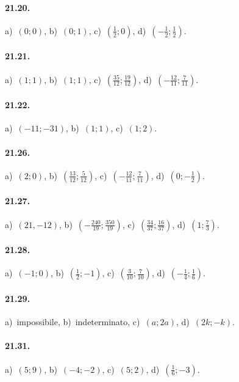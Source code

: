 \paragraph{21.20.} a)~$(0;0)$, \quad b)~$(0;1)$, \quad c)~$\left(\frac{1}{2};0\right)$, \quad d)~$\left(-{\frac{1}{2}};\frac{1}{2}\right)$.

\paragraph{21.21.} a)~$(1;1)$, \quad b)~$(1;1)$, \quad c)~$\left(\frac{35}{12};\frac{19}{12}\right)$, \quad d)~$\left(-{\frac{12}{11}};\frac{7}{11}\right)$.

\paragraph{21.22.} a)~$(-11;-31)$, \quad b)~$(1;1)$, \quad c)~$(1;2)$.

\paragraph{21.26.} a)~$(2;0)$, \quad b)~$\left(\frac{13}{12};\frac{5}{12}\right)$, \quad c)~$\left(-{\frac{12}{11}};\frac{7}{11}\right)$, \quad d)~$\left(0;-\frac{1}{2}\right)$.

\paragraph{21.27.} a)~$(21,-12)$, \quad b)~$\left(-{\frac{240}{19}};\frac{350}{19}\right)$, \quad c)~$\left(\frac{34}{37};\frac{16}{37}\right)$, \quad d)~$\left(1;\frac{7}{3}\right)$.

\paragraph{21.28.} a)~$\left(-1;0\right)$, \quad b)~$\left(\frac{1}{2};-1\right)$, \quad c)~$\left(\frac{3}{10};\frac{7}{10}\right)$, \quad d)~$\left(-{\frac{1}{4}};\frac{1}{6}\right)$.

\paragraph{21.29.} a)~impossibile, \quad b)~indeterminato, \quad c)~$(a;2a)$, \quad d)~$(2k;-k)$.

\paragraph{21.31.} a)~$\left(5;9\right)$, \quad b)~$\left(-4;-2\right)$, \quad c)~$\left(5;2\right)$, \quad d)~$\left({\frac{1}{6}};-3\right)$.

